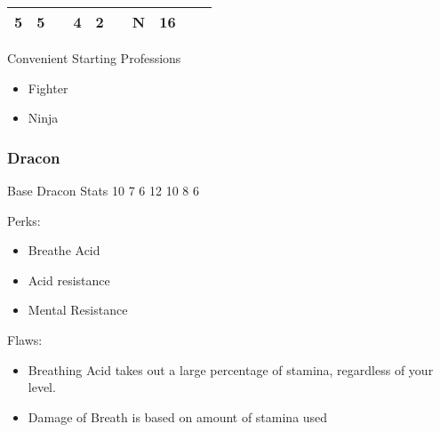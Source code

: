 \documentclass[12pt]{article}
\newcommand{\WviiTwoColumnSetup}{\raggedcolumns\RaggedRight}
\begin{document}
\begin{longtable}[]{@{}llllllllll@{}}
\begin{minipage}[t]{0.06\columnwidth}
5
\strut\end{minipage} &
\begin{minipage}[t]{0.06\columnwidth}\raggedright\strut
5
\strut\end{minipage} &
\begin{minipage}[t]{0.06\columnwidth}\raggedright\strut
\strut\end{minipage} &
\begin{minipage}[t]{0.06\columnwidth}\raggedright\strut
4
\strut\end{minipage} &
\begin{minipage}[t]{0.06\columnwidth}\raggedright\strut
2
\strut\end{minipage} &
\begin{minipage}[t]{0.06\columnwidth}\raggedright\strut
\strut\end{minipage} &
\begin{minipage}[t]{0.07\columnwidth}\raggedright\strut
N
\strut\end{minipage} &
\begin{minipage}[t]{0.08\columnwidth}\raggedright\strut
16
\strut\end{minipage}\tabularnewline
\bottomrule
\end{longtable}

Convenient Starting Professions

\begin{multicols}{2}\WviiTwoColumnSetup
\begin{itemize}
\item
  Fighter
\item
  Ninja
\end{itemize}
\end{multicols}

\subsubsection{Dracon}\label{dracon}

Base Dracon Stats 10 7 6 12 10 8 6

\begin{multicols}{2}\WviiTwoColumnSetup
Perks:

\begin{itemize}
\item
  Breathe Acid
\item
  Acid resistance
\item
  Mental Resistance
\end{itemize}
\columnbreak

Flaws:

\begin{itemize}
\item
  Breathing Acid takes out a large percentage of stamina, regardless of
  your level.
\item
  Damage of Breath is based on amount of stamina used
\end{itemize}
\end{multicols}
\end{document}

